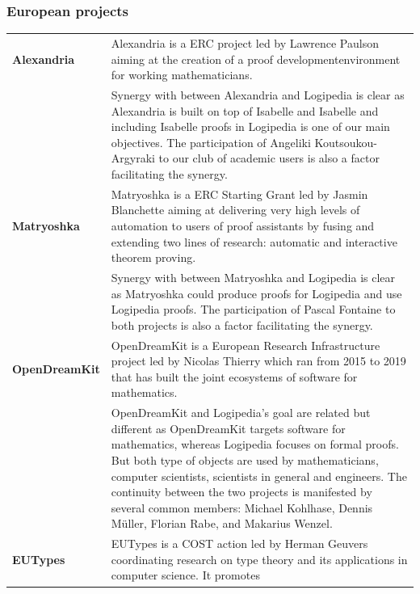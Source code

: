 
\subsubsection*{European projects}

\begin{longtable}{|p{}|p{}|}
\hline 
{\bf Alexandria}
&
Alexandria is a ERC project led by Lawrence Paulson aiming at the
creation of a proof developmentenvironment for working mathematicians.
\\
&
\hspace{0.4cm}
Synergy with between Alexandria and Logipedia is clear as Alexandria
is built on top of Isabelle and Isabelle and including Isabelle proofs
in Logipedia is one of our main objectives.  The participation of
Angeliki Koutsoukou-Argyraki to our club of academic users is also
a factor facilitating the synergy.
\\
\hline
{\bf Matryoshka} 
& 
Matryoshka is a ERC Starting Grant led by Jasmin Blanchette aiming at
delivering very high levels of automation to users of proof assistants
by fusing and extending two lines of research: automatic and
interactive theorem proving.
\\
&
\hspace{0.4cm} Synergy with between Matryoshka and Logipedia is clear
as Matryoshka could produce proofs for Logipedia and use Logipedia
proofs. The participation of Pascal Fontaine to both projects is also a
factor facilitating the synergy.
\\
\hline
{\bf OpenDreamKit} 
& 
OpenDreamKit is a European Research Infrastructure project led by
Nicolas Thierry which ran from 2015 to 2019 that has built the joint
ecosystems of software for mathematics.
\\
&
\hspace{0.4cm}
OpenDreamKit and Logipedia's goal are related but different as OpenDreamKit
targets software for mathematics, whereas Logipedia focuses on formal proofs. But both type 
of objects are used by mathematicians, computer scientists, scientists in 
general and engineers. The continuity between the two projects is manifested 
by several common members: Michael Kohlhase, Dennis Müller, 
Florian Rabe, and Makarius Wenzel. 
\\
\hline
{\bf EUTypes} 
& 
EUTypes is a COST action led by Herman Geuvers coordinating research
on type theory and its applications in computer science.  It promotes

\end{longtable}
